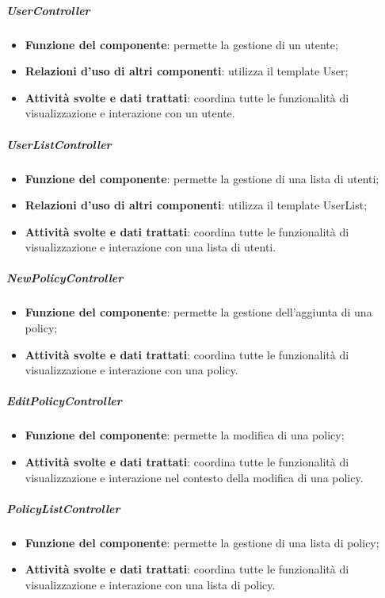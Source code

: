 \subparagraph{UserController}
\begin{itemize}
	\item \textbf{Funzione del componente}: permette la gestione di un utente;
	\item \textbf{Relazioni d’uso di altri componenti}: utilizza il template User;
	\item \textbf{Attività svolte e dati trattati}: coordina tutte le funzionalità di visualizzazione e interazione con un utente.
\end{itemize}

\subparagraph{UserListController}
\begin{itemize}
	\item \textbf{Funzione del componente}: permette la gestione di una lista di utenti;
	\item \textbf{Relazioni d’uso di altri componenti}: utilizza il template UserList;
	\item \textbf{Attività svolte e dati trattati}: coordina tutte le funzionalità di visualizzazione e interazione con una lista di utenti.
\end{itemize}

\subparagraph{NewPolicyController}
\begin{itemize}
	\item \textbf{Funzione del componente}: permette la gestione dell'aggiunta di una policy;
	\item \textbf{Attività svolte e dati trattati}: coordina tutte le funzionalità di visualizzazione e interazione con una policy.
\end{itemize}

\subparagraph{EditPolicyController}
\begin{itemize}
	\item \textbf{Funzione del componente}: permette la modifica di una policy;
	\item \textbf{Attività svolte e dati trattati}: coordina tutte le funzionalità di visualizzazione e interazione nel contesto della modifica di una policy.
\end{itemize}

\subparagraph{PolicyListController}
\begin{itemize}
	\item \textbf{Funzione del componente}: permette la gestione di una lista di policy;
	\item \textbf{Attività svolte e dati trattati}: coordina tutte le funzionalità di visualizzazione e interazione con una lista di policy.
\end{itemize}



